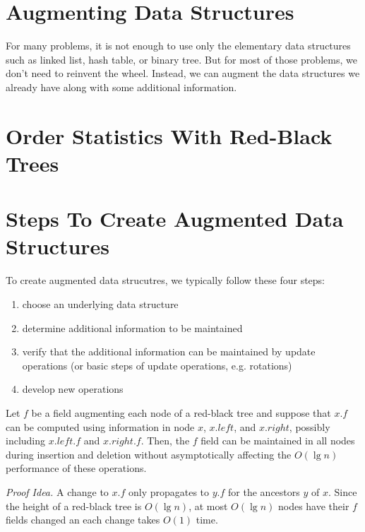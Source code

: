 \section{Augmenting Data Structures}

For many problems, it is not enough to use only the elementary data structures such as linked list, hash table, or binary tree. But for most of those problems, we don't need to reinvent the wheel. Instead, we can augment the data structures we already have along with some additional information.

\section{Order Statistics With Red-Black Trees}

\section{Steps To Create Augmented Data Structures}

To create augmented data strucutres, we typically follow these four steps:

\begin{enumerate}
    \item choose an underlying data structure
    \item determine additional information to be maintained
    \item verify that the additional information can be maintained by update operations (or basic steps of update operations, e.g. rotations)
    \item develop new operations
\end{enumerate}

\begin{theorem}
    Let $f$ be a field augmenting each node of a red-black tree and suppose that $x.f$ can be computed using information in node $x$, $x.left$, and $x.right$, possibly including $x.left.f$ and $x.right.f$. Then, the $f$ field can be maintained in all nodes during insertion and deletion without asymptotically affecting the $O(\lg n)$ performance of these operations.  
\end{theorem}

\textit{Proof Idea.} A change to $x.f$ only propagates to $y.f$ for the ancestors $y$ of $x$. Since the height of a red-black tree is $O(\lg n)$, at most $O(\lg n)$ nodes have their $f$ fields changed an each change takes $O(1)$ time.